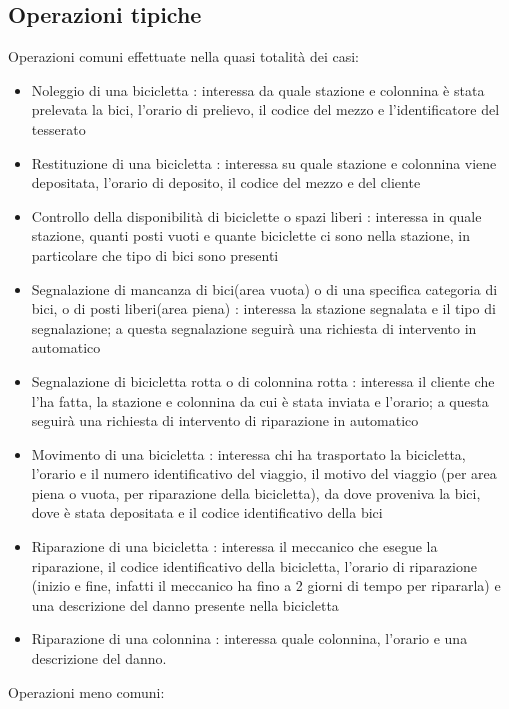 \documentclass[a4paper,twoside]{article}
\begin{document}
\subsection{Operazioni tipiche}
Operazioni comuni effettuate nella quasi totalità dei casi:
\begin{itemize}
 \item Noleggio di una bicicletta : interessa da quale stazione e colonnina è stata prelevata la bici, l'orario di prelievo, il codice del mezzo e l'identificatore del tesserato
 \item Restituzione di una bicicletta : interessa su quale stazione e colonnina viene depositata, l'orario di deposito, il codice del mezzo e del cliente
 \item Controllo della disponibilità di biciclette o spazi liberi : interessa in quale stazione, quanti posti vuoti e quante biciclette ci sono nella stazione, in particolare che tipo di bici sono presenti
 \item Segnalazione di mancanza di bici(area vuota) o di una specifica categoria di bici, o di posti liberi(area piena) : interessa la stazione segnalata e il tipo di segnalazione; a questa segnalazione seguirà una richiesta di intervento in automatico
 \item Segnalazione di bicicletta rotta o di colonnina rotta : interessa il cliente che l'ha fatta, la stazione e colonnina da cui è stata inviata e l'orario; a questa seguirà una richiesta di intervento di riparazione in automatico
 \item Movimento di una bicicletta : interessa chi ha trasportato la bicicletta, l'orario e il numero identificativo del viaggio, il motivo del viaggio (per area piena o vuota, per riparazione della bicicletta), da dove proveniva la bici, dove è stata depositata e il codice identificativo della bici
 \item Riparazione di una bicicletta : interessa il meccanico che esegue la riparazione, il codice identificativo della bicicletta, l'orario di riparazione (inizio e fine, infatti il meccanico ha fino a 2 giorni di tempo per ripararla) e una descrizione del danno presente nella bicicletta
 \item Riparazione di una colonnina : interessa quale colonnina, l'orario e una descrizione del danno.
\end{itemize}
Operazioni meno comuni:
\end{document}
